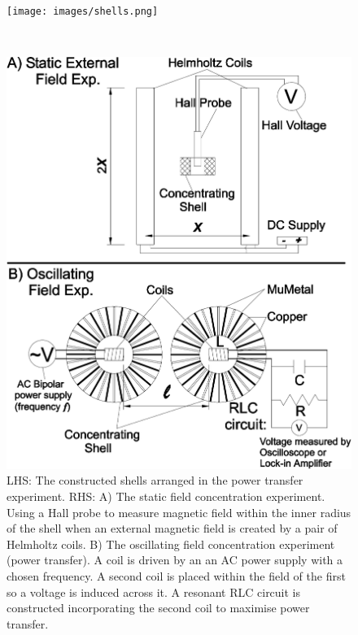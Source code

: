 \documentclass[11pt]{iopart}
\begin{document}
\begin{figure}
\begin{center}
    \begin{minipage}{0.434\textwidth}
        \noindent\texttt{[image: images/shells.png]}
    \end{minipage}
    ~~~
    \begin{minipage}{0.465\textwidth}
        \noindent\includegraphics[width=\linewidth]{images/all_schem.pdf}
    \end{minipage}
\caption{LHS: The constructed shells arranged in the power transfer
  experiment. RHS: A) The static field concentration experiment. Using
  a Hall probe to measure magnetic field within the inner radius of
  the shell when an external magnetic field is created by a pair of
  Helmholtz coils. B) The oscillating field concentration experiment
  (power transfer). A coil is driven by an an AC power supply with a
  chosen frequency. A second coil is placed within the field of the
  first so a voltage is induced across it. A resonant RLC circuit is
  constructed incorporating the second coil to maximise power
  transfer.}
\label{fig:shells}
\end{center}
  \vspace{-0.7em}
\end{figure}
\end{document}
